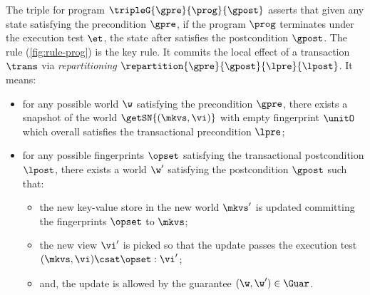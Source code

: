 
The triple for program \( \tripleG{\gpre}{\prog}{\gpost} \) asserts that given any state satisfying the precondition \( \gpre \), if the program \( \prog \) terminates under the execution test \( \et \), the state after satisfies the postcondition \( \gpost \).
The  rule (\cref{fig:rule-prog}) is the key rule.
It commits the local effect of a transaction \( \trans \) via \emph{repartitioning} \( \repartition{\gpre}{\gpost}{\lpre}{\lpost} \).
It means:
\begin{itemize}
\item
for any possible world \( \w \) satisfying the precondition \( \gpre \), there exists a snapshot of the world \( \getSN{(\mkvs, \vi)} \) with empty fingerprint \( \unitO \) which overall satisfies the transactional precondition \( \lpre \);
\item
for any possible fingerprints  \( \opset \) satisfying the transactional postcondition \( \lpost \), there exists a world \( \w' \) satisfying the postcondition \( \gpost \) such that:
\begin{itemize}
\item 
the new key-value store in the new world \( \mkvs' \) is updated committing the fingerprints \( \opset \) to \( \mkvs \);
\item
the new view \( \vi' \) is picked so that the update passes the execution test \( (\mkvs,\vi) \csat \opset : \vi' \);
\item
and, the update is allowed by the guarantee \( (\w, \w') \in \Guar\).
\end{itemize}
\end{itemize}


